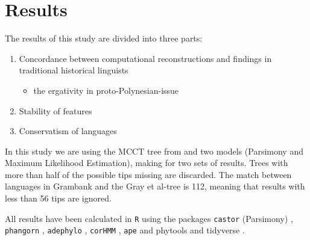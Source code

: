 \documentclass[draft,10pt]{article} %
\begin{document}





\newpage
\section{Results}
The results of this study are divided into three parts:

\begin{enumerate}
\item Concordance between computational reconstructions and findings in traditional historical linguists
\begin{itemize}
\item the ergativity in proto-Polynesian-issue
\end{itemize}
\item Stability of features
\item Conservatism of languages
\end{enumerate}

In this study we are using the MCCT tree from \citet{grayetal_2009} and two models (Parsimony and Maximum Likelihood Estimation), making for two sets of results. Trees with more than half of the possible tips missing are discarded. The match between languages in Grambank and the Gray et al-tree is 112, meaning that results with less than 56 tips are ignored.  %

All results have been calculated in \texttt{R} \citep{R} using the packages \texttt{castor} (Parsimony) \citep{louca2017efficient}, \texttt{phangorn} \citet{phangorn}, \texttt{adephylo} \citep{jombart2017package}, \texttt{corHMM} \citep{corHMM}, \texttt{ape} \cite{paradis2004ape} and phytools \citep{revell2012phytools} and tidyverse \citep{tidyverse13}.
\end{document}
